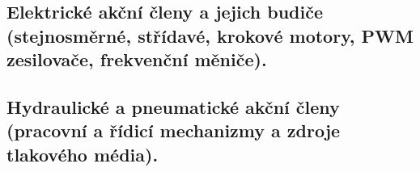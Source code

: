 \subsection{Elektrické akční členy a jejich budiče (stejnosměrné, střídavé, krokové motory, PWM zesilovače, frekvenční měniče).}

\subsection{Hydraulické a pneumatické akční členy (pracovní a řídicí mechanizmy a zdroje tlakového média).}